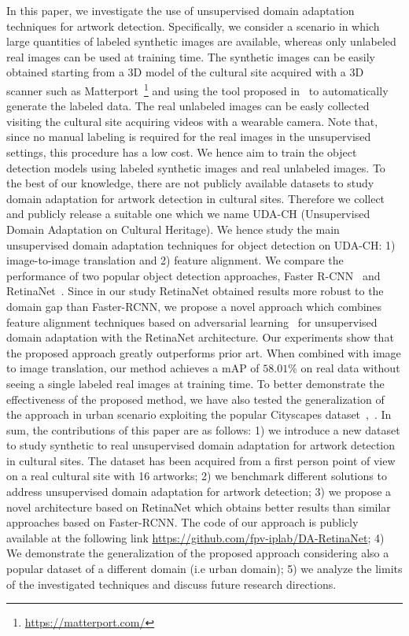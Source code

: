 \documentclass[preprint]{elsarticle}
\begin{document}
In this paper, we investigate the use of unsupervised domain adaptation techniques for artwork detection. Specifically, we consider a scenario in which large quantities of labeled synthetic images are available, whereas only unlabeled real images can be used at training time. The synthetic images can be easily obtained starting from a 3D model of the cultural site acquired with a 3D scanner such as Matterport~\footnote{\url{https://matterport.com/}} and using the tool proposed in~\cite{orlando2020egocentric} to automatically generate the labeled data. The real unlabeled images can be easly collected visiting the cultural site acquiring videos with a wearable camera. Note that, since no manual labeling is required for the real images in the unsupervised settings, this procedure has a low cost. We hence aim to train the object detection models using labeled synthetic images and real unlabeled images. To the best of our knowledge, there are not publicly available datasets to study domain adaptation for artwork detection in cultural sites. Therefore we collect and publicly release a suitable one which we name UDA-CH (Unsupervised Domain Adaptation on Cultural Heritage). We hence study the main unsupervised domain adaptation techniques for object detection on UDA-CH: 1) image-to-image translation and 2) feature alignment. We compare the performance of two popular object detection approaches, Faster R-CNN~\cite{DBLP:journals/corr/RenHG015} and RetinaNet~\cite{DBLP:journals/corr/abs-1708-02002}. Since in our study RetinaNet obtained results more robust to the domain gap than Faster-RCNN, we propose a novel approach which combines feature alignment techniques based on adversarial learning~\cite{ganin2014unsupervised} for unsupervised domain adaptation with the RetinaNet architecture. Our experiments show that the proposed approach greatly outperforms prior art. When combined with image to image translation, our method achieves a mAP of $58.01\%$ on real data without seeing a single labeled real images at training time. To better demonstrate the effectiveness of the proposed method, we have also tested the generalization of the approach in urban scenario exploiting the popular Cityscapes dataset~\cite{cordts2016cityscapes},~\cite{sakaridis2018semantic}.
\newline
In sum, the contributions of this paper are as follows: 1) we introduce a new dataset to study synthetic to real unsupervised domain adaptation for artwork detection in cultural sites. The dataset has been acquired from a first person point of view on a real cultural site with 16 artworks; 2) we benchmark different solutions to address unsupervised domain adaptation for artwork detection; 3) we propose a novel architecture based on RetinaNet which obtains better results than similar approaches based on Faster-RCNN. The code of our approach is publicly available at the following link \url{https://github.com/fpv-iplab/DA-RetinaNet}; 4) We demonstrate the generalization of the proposed approach considering also a popular dataset of a different domain (i.e urban domain); 5) we analyze the limits of the investigated techniques and discuss future research directions. \newline
\end{document}
